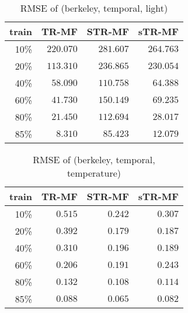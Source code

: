 \begin{table} [htbp]
\setlength{\tabcolsep}{2pt}
\centering
\caption{RMSE of (berkeley, temporal, light)}
\label{table:spatial_temporal_light}
\begin{tabular} {r | r r r}
	train	& TR-MF	&	STR-MF	&	sTR-MF	\\ \hline
	10\% & $ \mathbf{ 220.070 } $ & $ 281.607 $ & $ 264.763 $ \\
	20\% & $ \mathbf{ 113.310 } $ & $ 236.865 $ & $ 230.054 $ \\
	40\% & $ \mathbf{ 58.090 } $ & $ 110.758 $ & $ 64.388 $ \\
	60\% & $ \mathbf{ 41.730 } $ & $ 150.149 $ & $ 69.235 $ \\
	80\% & $ \mathbf{ 21.450 } $ & $ 112.694 $ & $ 28.017 $ \\
	85\% & $ \mathbf{ 8.310 } $ & $ 85.423 $ & $ 12.079 $ \\
\end{tabular}
\end{table}


\begin{table} [htbp]
\setlength{\tabcolsep}{2pt}
\centering
\caption{RMSE of (berkeley, temporal, temperature)}
\label{table:spatial_temporal_tem}
\begin{tabular} {r | r r r}
	train	& TR-MF	&	STR-MF	&	sTR-MF	\\ \hline
	10\% & $ 0.515 $ & $ \mathbf{ 0.242 } $ & $ 0.307 $ \\
	20\% & $ 0.392 $ & $ \mathbf{ 0.179 } $ & $ 0.187 $ \\
	40\% & $ 0.310 $ & $ 0.196 $ & $ \mathbf{ 0.189 } $ \\
	60\% & $ 0.206 $ & $ \mathbf{ 0.191 } $ & $ 0.243 $ \\
	80\% & $ 0.132 $ & $ \mathbf{ 0.108 } $ & $ 0.114 $ \\
	85\% & $ 0.088 $ & $ \mathbf{ 0.065 } $ & $ 0.082 $ \\
\end{tabular}
\end{table}

